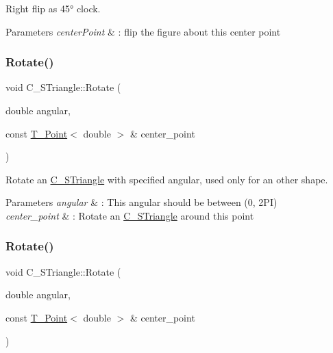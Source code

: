 Right flip as 45° clock. 


\begin{DoxyParams}{Parameters}
{\em center\+Point} & \+: flip the figure about this center point \\
\hline
\end{DoxyParams}
\mbox{\label{classC__STriangle_afe6a1fcb5bf97792dd38e698bb6ad0cd}} 
\subsubsection{\texorpdfstring{Rotate()}{Rotate()}\hspace{0.1cm}{\footnotesize\ttfamily [1/2]}}
{\footnotesize\ttfamily void C\+\_\+\+S\+Triangle\+::\+Rotate (\begin{DoxyParamCaption}\item[{double}]{angular,  }\item[{const \hyperlink{classT__Point}{T\+\_\+\+Point}$<$ double $>$ \&}]{center\+\_\+point }\end{DoxyParamCaption})}



Rotate an \hyperlink{classC__STriangle}{C\+\_\+\+S\+Triangle} with specified angular, used only for an other shape. 


\begin{DoxyParams}{Parameters}
{\em angular} & \+: This angular should be between (0, 2\+PI) \\
\hline
{\em center\+\_\+point} & \+: Rotate an \hyperlink{classC__STriangle}{C\+\_\+\+S\+Triangle} around this point \\
\hline
\end{DoxyParams}
\mbox{\label{classC__STriangle_afe6a1fcb5bf97792dd38e698bb6ad0cd}} 
\subsubsection{\texorpdfstring{Rotate()}{Rotate()}\hspace{0.1cm}{\footnotesize\ttfamily [2/2]}}
{\footnotesize\ttfamily void C\+\_\+\+S\+Triangle\+::\+Rotate (\begin{DoxyParamCaption}\item[{double}]{angular,  }\item[{const \hyperlink{classT__Point}{T\+\_\+\+Point}$<$ double $>$ \&}]{center\+\_\+point }\end{DoxyParamCaption})}



